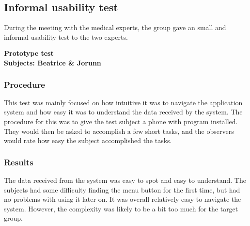 \subsection{Informal usability test}
During the meeting with the medical experts, the group gave an small and informal usability test to the two experts. 

\textbf{Prototype test}\\
\textbf{Subjects: Beatrice \& Jorunn}
\\

\subsubsection{Procedure}
This test was mainly focused on how intuitive it was to navigate the application system and how easy it was to understand the data received by the system. The procedure for this was to give the test subject a phone with program installed. They would then be asked to accomplish a few short tasks, and the observers would rate how easy the subject accomplished the tasks. 

\subsubsection{Results}
The data received from the system was easy to spot and easy to understand. The subjects had some difficulty finding the menu button for the first time, but had no problems with using it later on. It was overall relatively easy to navigate the system. However, the complexity was likely to be a bit too much for the target group.